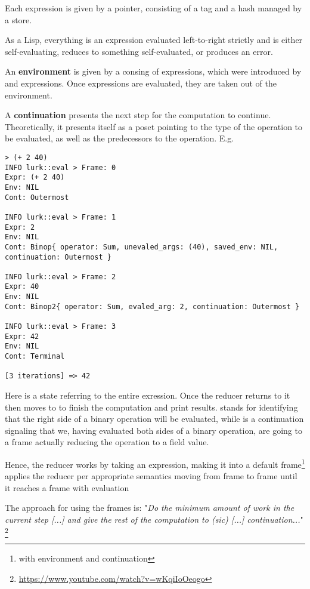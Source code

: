 \documentclass[
    9pt,            %
    techreport,        %
    affiltop,       %
]{art}
\begin{document}
Each expression is given by a pointer, consisting of a tag and a hash managed by a store.

As a Lisp, everything is an expression evaluated left-to-right strictly and is either self-evaluating, reduces to something self-evaluated, or produces an error. 


An \textbf{environment} is given by a consing of expressions, which were introduced by  and  expressions. Once expressions are evaluated, they are taken out of the environment.

A \textbf{continuation} presents the next step for the computation to continue. Theoretically, it presents itself as a poset pointing to the type of the operation to be evaluated, as well as the predecessors to the operation. E.g. 

\begin{verbatim}
> (+ 2 40)
INFO lurk::eval > Frame: 0 
Expr: (+ 2 40)
Env: NIL
Cont: Outermost

INFO lurk::eval > Frame: 1 
Expr: 2
Env: NIL
Cont: Binop{ operator: Sum, unevaled_args: (40), saved_env: NIL, continuation: Outermost }

INFO lurk::eval > Frame: 2 
Expr: 40
Env: NIL
Cont: Binop2{ operator: Sum, evaled_arg: 2, continuation: Outermost }

INFO lurk::eval > Frame: 3 
Expr: 42
Env: NIL
Cont: Terminal

[3 iterations] => 42
\end{verbatim}

Here  is a state referring to the entire exression. Once the reducer returns to  it then moves to  to finish the computation and print results.   stands for identifying that the right side of a binary operation will be evaluated, while  is a continuation signaling that we, having evaluated both sides of a binary operation, are going to a frame actually reducing the operation to a field value.

Hence, the reducer works by taking an expression, making it into a default frame\footnote{with  environment and  continuation} applies the reducer per appropriate semantics moving from frame to frame until it reaches a frame with  evaluation 

The approach for using the frames is: "\textit{Do the minimum amount of work in the current step [...] and give the rest of the computation to (sic) [...] continuation...}" \footnote{\url{https://www.youtube.com/watch?v=wKqiIoOeogo}}
\end{document}
